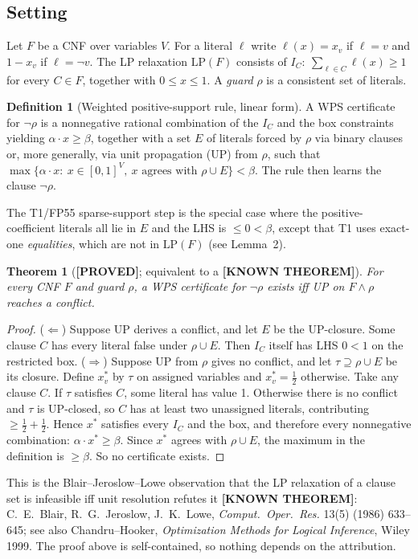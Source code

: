 \documentclass[11pt]{article}
\newtheorem{theorem}{Theorem}
\theoremstyle{definition}
\newtheorem{definition}{Definition}
\newcommand{\lab}[1]{\textbf{[#1]}}
\begin{document}
\subsection{Setting}
Let $F$ be a CNF over variables $V$. For a literal $\ell$ write $\ell(x)=x_v$ if
$\ell=v$ and $1-x_v$ if $\ell=\neg v$. The LP relaxation $\mathrm{LP}(F)$ consists of
$I_C:\ \sum_{\ell\in C}\ell(x)\ge1$ for every $C\in F$, together with $0\le x\le1$.
A \emph{guard} $\rho$ is a consistent set of literals.

\begin{definition}[Weighted positive-support rule, linear form]
A WPS certificate for $\neg\rho$ is a nonnegative rational combination of the $I_C$
and the box constraints yielding $\alpha\cdot x\ge\beta$, together with a set $E$
of literals forced by $\rho$ via binary clauses or, more generally, via unit
propagation (UP) from $\rho$, such that $\max\{\alpha\cdot x:\ x\in[0,1]^V,\ x
\text{ agrees with }\rho\cup E\}<\beta$. The rule then learns the clause $\neg\rho$.
\end{definition}
The T1/FP55 sparse-support step is the special case where the positive-coefficient
literals all lie in $E$ and the LHS is $\le0<\beta$, except that T1 uses
exact-one \emph{equalities}, which are not in $\mathrm{LP}(F)$ (see Lemma~2).

\begin{theorem}[\lab{PROVED}; equivalent to a \lab{KNOWN THEOREM}]
For every CNF $F$ and guard $\rho$, a WPS certificate for $\neg\rho$ exists iff
UP on $F\wedge\rho$ reaches a conflict.
\end{theorem}
\begin{proof}
($\Leftarrow$) Suppose UP derives a conflict, and let $E$ be the UP-closure. Some
clause $C$ has every literal false under $\rho\cup E$. Then $I_C$ itself has LHS
$0<1$ on the restricted box.
($\Rightarrow$) Suppose UP from $\rho$ gives no conflict, and let $\tau\supseteq\rho\cup E$
be its closure. Define $x^*_v$ by $\tau$ on assigned variables and $x^*_v=\tfrac12$
otherwise. Take any clause $C$. If $\tau$ satisfies $C$, some literal has value 1.
Otherwise there is no conflict and $\tau$ is UP-closed, so $C$ has at least two
unassigned literals, contributing $\ge\tfrac12+\tfrac12$. Hence $x^*$ satisfies every
$I_C$ and the box, and therefore every nonnegative combination: $\alpha\cdot x^*\ge\beta$.
Since $x^*$ agrees with $\rho\cup E$, the maximum in the definition is $\ge\beta$.
So no certificate exists.
\end{proof}
This is the Blair--Jeroslow--Lowe observation that the LP relaxation of a clause set is
infeasible iff unit resolution refutes it \lab{KNOWN THEOREM}: C.~E.~Blair,
R.~G.~Jeroslow, J.~K.~Lowe, \emph{Comput.\ Oper.\ Res.} 13(5) (1986) 633--645; see also
Chandru--Hooker, \emph{Optimization Methods for Logical Inference}, Wiley 1999. The proof
above is self-contained, so nothing depends on the attribution.
\end{document}

